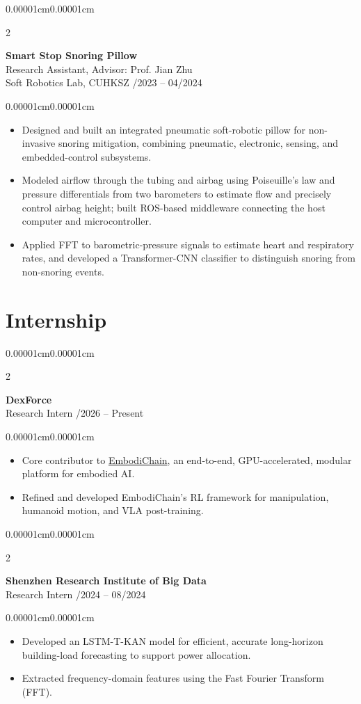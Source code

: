 \documentclass[10pt,letterpaper]{article}
\newenvironment{highlights}{\begin{itemize}[topsep=0.09cm,parsep=0pt,partopsep=0pt,itemsep=0.04cm,leftmargin=0.4cm]}{\end{itemize}}
\newenvironment{onecolentry}{\begin{adjustwidth}{0.00001cm}{0.00001cm}}{\end{adjustwidth}}
\newenvironment{twocolentry}[2][]{%
  \onecolentry
  \def\secondColumn{#2}
  \setcolumnwidth{\fill,3.7cm}
  \begin{paracol}{2}
}{%
  \switchcolumn\raggedleft\secondColumn
  \end{paracol}
  \endonecolentry
}
\begin{document}
\begin{twocolentry}{09/2023 -- 04/2024}
  \textbf{Smart Stop Snoring Pillow}\\
  Research Assistant, Advisor: Prof. Jian Zhu\\
  Soft Robotics Lab, CUHKSZ
\end{twocolentry}
\begin{onecolentry}
  \begin{highlights}
    \item Designed and built an integrated pneumatic soft-robotic pillow for non-invasive snoring mitigation, combining pneumatic, electronic, sensing, and embedded-control subsystems.
    \item Modeled airflow through the tubing and airbag using Poiseuille’s law and pressure differentials from two barometers to estimate flow and precisely control airbag height; built ROS-based middleware connecting the host computer and microcontroller.
    \item Applied FFT to barometric-pressure signals to estimate heart and respiratory rates, and developed a Transformer-CNN classifier to distinguish snoring from non-snoring events.
  \end{highlights}
\end{onecolentry}
\vspace{0.16cm}

\newpage
\section{Internship}
\begin{twocolentry}{01/2026 -- Present}
  \textbf{DexForce}\\
  Research Intern
\end{twocolentry}
\begin{onecolentry}
  \begin{highlights}
    \item Core contributor to \href{https://github.com/DexForce/EmbodiChain}{EmbodiChain}, an end-to-end, GPU-accelerated, modular platform for embodied AI.
    \item Refined and developed EmbodiChain's RL framework for manipulation, humanoid motion, and VLA post-training.
  \end{highlights}
\end{onecolentry}
\vspace{0.16cm}

\begin{twocolentry}{04/2024 -- 08/2024}
  \textbf{Shenzhen Research Institute of Big Data}\\
  Research Intern
\end{twocolentry}
\begin{onecolentry}
  \begin{highlights}
    \item Developed an LSTM-T-KAN model for efficient, accurate long-horizon building-load forecasting to support power allocation.
    \item Extracted frequency-domain features using the Fast Fourier Transform (FFT).
  \end{highlights}
\end{onecolentry}
\end{document}
